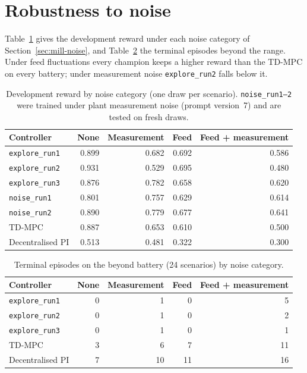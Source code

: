 \section{Robustness to noise}
\label{sec:mill-noise-results}
Table~\ref{tab:mill-noise-results} gives the development reward under each
noise category of Section~\ref{sec:mill-noise}, and
Table~\ref{tab:mill-noise-beyond} the terminal episodes beyond the range.
Under feed fluctuations every champion keeps a higher reward than the TD-MPC on
every battery; under measurement noise \texttt{explore\_run2} falls below it.

\begin{table}[tb]
  \centering
  \caption{Development reward by noise category (one draw per scenario).
    \texttt{noise\_run1--2} were trained under plant measurement noise (prompt
    version~7) and are tested on fresh draws.}
  \label{tab:mill-noise-results}
  \small
  \begin{tabular}{@{}lrrrr@{}}
    \toprule
    Controller & None & Measurement & Feed & Feed + measurement \\
    \midrule
    \texttt{explore\_run1} & 0.899 & 0.682 & 0.692 & 0.586 \\
    \texttt{explore\_run2} & 0.931 & 0.529 & 0.695 & 0.480 \\
    \texttt{explore\_run3} & 0.876 & 0.782 & 0.658 & 0.620 \\
    \texttt{noise\_run1}   & 0.801 & 0.757 & 0.629 & 0.614 \\
    \texttt{noise\_run2}   & 0.890 & 0.779 & 0.677 & 0.641 \\
    TD-MPC                 & 0.887 & 0.653 & 0.610 & 0.500 \\
    Decentralised PI       & 0.513 & 0.481 & 0.322 & 0.300 \\
    \bottomrule
  \end{tabular}
\end{table}

\begin{table}[tb]
  \centering
  \caption{Terminal episodes on the beyond battery (24 scenarios) by noise
    category.}
  \label{tab:mill-noise-beyond}
  \small
  \begin{tabular}{@{}lrrrr@{}}
    \toprule
    Controller & None & Measurement & Feed & Feed + measurement \\
    \midrule
    \texttt{explore\_run1} & 0 & 1 & 0 & 5 \\
    \texttt{explore\_run2} & 0 & 1 & 0 & 2 \\
    \texttt{explore\_run3} & 0 & 1 & 0 & 1 \\
    TD-MPC                 & 3 & 6 & 7 & 11 \\
    Decentralised PI       & 7 & 10 & 11 & 16 \\
    \bottomrule
  \end{tabular}
\end{table}

